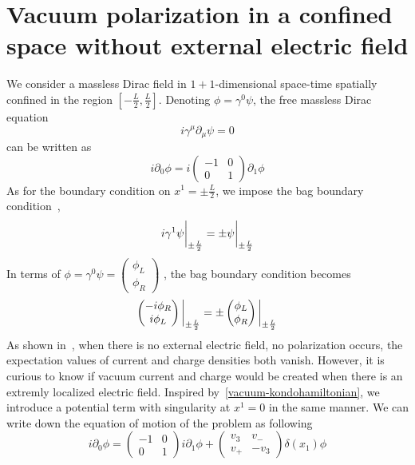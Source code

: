 \section{Vacuum polarization in a confined space without external electric field}\label{sect-nef}
We consider a massless Dirac field in $1+1$-dimensional space-time spatially confined in the region $[-\frac L 2 , \frac L 2 ]$.
Denoting $\phi = \gamma^0\psi$, the free massless Dirac equation
\begin{equation*}
i\gamma^\mu\partial_\mu \psi = 0
\end{equation*}
can be written as
\begin{equation*}
i\partial_0\phi = i \begin{pmatrix} -1 & 0 \\ 0 & 1 \end{pmatrix}\partial_1\phi
\end{equation*}
%
As for the boundary condition on $x^1 = \pm \frac L 2$, we impose the bag boundary condition~\cite{Chodos1974}, \ie 
\begin{equation*}
i\gamma^1 \psi \bigg\rvert_{\pm \frac{L}{2}} = \pm \psi \bigg\rvert_{\pm \frac{L}{2}}
\end{equation*}
In terms of $\phi = \gamma^0\psi = \begin{pmatrix} \phi_L \\ \phi_R \end{pmatrix}$
, the bag boundary condition becomes
\begin{equation}\label{vacuum-bagboundcond}
\begin{pmatrix}
-i \phi_R \\
i \phi_L
\end{pmatrix} \bigg\rvert_{\pm \frac{L}{2}} = \pm \begin{pmatrix}
\phi_L \\
\phi_R
\end{pmatrix} \bigg\rvert_{\pm \frac{L}{2}}
\end{equation}
%
As shown in~\cite{Zahn2015}, when there is no external electric field, no polarization occurs,
\ie the expectation values of current and charge densities both vanish. 
However, it is curious to know if vacuum current and charge would be created when there is an extremly localized electric field.
Inspired by~\cref{vacuum-kondohamiltonian}, we introduce a potential term with singularity at $x^1 = 0$ in the same manner.
We can write down the equation of motion of the problem as following
\begin{equation}\label{nef-Dirac}
i \partial_0 \phi = 
\begin{pmatrix} 
-1 & 0 \\
0 & 1 
\end{pmatrix} i \partial_1 \phi +
\begin{pmatrix}
v_3 & v_- \\
v_+ & -v_3
\end{pmatrix} \delta(x_1) \phi
\end{equation}
